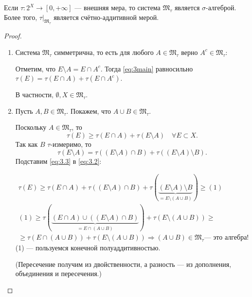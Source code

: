 \begin{theorem}
    Если $\tau: 2^X \to [0, + \infty]$ — внешняя мера, то система $\mathfrak{M}_{\tau}$ является $\sigma$-алгеброй. Более того, $\tau|_{\mathfrak{M}_{\tau}}$ является счётно-аддитивной мерой.
\end{theorem} 
\begin{proof}\tab
    \begin{enumerate}
        \item Система $\mathfrak{M}_{\tau}$ симметрична, то есть для любого $A \in \mathfrak{M_{\tau}}$ верно $A^c \in \mathfrak{M}_{\tau}$:
        
        Отметим, что $E \setminus A = E \cap A^c$.
        Тогда \eqref{eq:3main} равносильно $\tau(E) = \tau(E \cap A) + \tau(E \cap A^c)$.

        В частности, $\emptyset, X \in \mathfrak{M}_{\tau}$.

        \item Пусть $A, B \in \mathfrak{M}_{\tau}$.
        Покажем, что $A \cup B \in \mathfrak{M}_{\tau}$.

        Поскольку $A \in \mathfrak{M}_{\tau}$, то
        \begin{equation}
            \tau(E) \geqslant \tau(E \cap A) + \tau(E \setminus A) \quad \forall E \subset X. \label{eq:3.2}
        \end{equation}
        Так как $B$ $\tau$-измеримо, то
        \begin{equation}
            \tau(E \setminus A) = \tau((E \setminus A) \cap B) + \tau((E \setminus A) \setminus B). \label{eq:3.3}
        \end{equation}
        Подставим \eqref{eq:3.3} в \eqref{eq:3.2}:

        \begin{multline*}
            \tau(E) \geqslant \tau(E \cap A) + \tau((E \setminus A) \cap B) + \tau(\underbrace{(E \setminus A) \setminus B}_{= E \setminus (A \cup B)}) \geqslant (1) \\(1) \geqslant \tau(\underbrace{(E \cap A) \cup ((E \setminus A) \cap B)}_{=E \cap (A \cup B)}) + \tau(E \setminus (A \cup B)) \geqslant\\ \geqslant \tau(E \cap (A \cup B)) + \tau(E \setminus (A \cup B)) \Longrightarrow (A \cup B) \in \mathfrak{M}_{\tau} \text{— это алгебра!}
        \end{multline*}
        (1) — пользуемся конечной полуаддитивностью.

        (Пересечение получим из двойственности, а разность — из дополнения, объединения и пересечения.)


\end{enumerate}
\end{proof}
